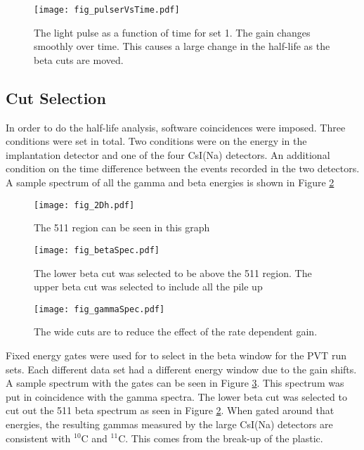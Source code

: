 \documentclass[main.tex]{subfiles}
\begin{document}
\begin{figure}[!htb]
	\centerline{\texttt{[image: fig\_pulserVsTime.pdf]}}
	\caption{The light pulse as a function of time for set 1.
		 The gain changes smoothly over time.
		 This causes a large change in the half-life as the beta cuts are moved.}
	\label{fig:pulserfig}
\end{figure}

\subsection{Cut Selection}
In order to do the half-life analysis, software coincidences were imposed.
Three conditions were set in total.
Two conditions were on the energy in the implantation detector and one of the four CsI(Na) detectors.
An additional condition on the time difference between the events recorded in the two detectors. 
A sample spectrum of all the gamma and beta energies is shown in Figure \ref{fig:2DGraph}  

\begin{figure}[!htb]
	\centerline{\texttt{[image: fig\_2Dh.pdf]}}
	\caption{The 511 region can be seen in this graph}
	\label{fig:2DGraph}
\end{figure}

\begin{figure}[!htb]
	\centerline{\texttt{[image: fig\_betaSpec.pdf]}}
	\caption{The lower beta cut was selected to be above the 511 region.
		 The upper beta cut was selected to include all the pile up}
	
	\label{fig:BetaGraph}
\end{figure}

\begin{figure}[!htb]
	\centerline{\texttt{[image: fig\_gammaSpec.pdf]}}
	\caption{The wide cuts are to reduce the effect of the rate dependent gain.}
	\label{fig:GammaGraph}
\end{figure}

Fixed energy gates were used for to select in the beta window for the PVT run sets.
Each different data set had a different energy window due to the gain shifts.
A sample spectrum with the gates can be seen in Figure \ref{fig:BetaGraph}.
This spectrum was put in coincidence with the gamma spectra. 
The lower beta cut was selected to cut out the 511 beta spectrum as seen in Figure \ref{fig:2DGraph}.
When gated around that energies, the resulting gammas measured by the large CsI(Na) detectors are consistent with $^{10}$C and $^{11}$C.
This comes from the break-up of the plastic. 
\end{document}
